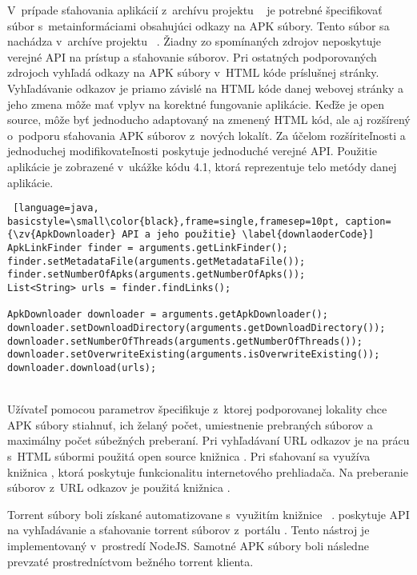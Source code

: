 \noindent V~prípade sťahovania aplikácií z~archívu projektu ~\cite{Viennot2014} je potrebné špecifikovať súbor s~metainformáciami obsahujúci odkazy na APK súbory. Tento súbor sa nachádza v~archíve projektu ~\cite{archiveOrg}. Žiadny zo spomínaných zdrojov neposkytuje verejné API na prístup a sťahovanie súborov. Pri ostatných podporovaných zdrojoch  vyhľadá odkazy na APK súbory v~HTML kóde príslušnej stránky. Vyhľadávanie odkazov je priamo závislé na HTML kóde danej webovej stránky a jeho zmena môže mať vplyv na korektné fungovanie aplikácie. Keďže je  open source, môže byť jednoducho adaptovaný na zmenený HTML kód, ale aj rozšírený o~podporu sťahovania APK súborov z~nových lokalít. Za účelom rozšíriteľnosti a jednoduchej modifikovateľnosti poskytuje  jednoduché verejné API. Použitie aplikácie  je zobrazené v~ukážke kódu 4.1, ktorá reprezentuje telo metódy  danej aplikácie. \\
\begin{lstlisting} [language=java, basicstyle=\small\color{black},frame=single,framesep=10pt, caption= {\zv{ApkDownloader} API a jeho použitie} \label{downlaoderCode}]
ApkLinkFinder finder = arguments.getLinkFinder();
finder.setMetadataFile(arguments.getMetadataFile());
finder.setNumberOfApks(arguments.getNumberOfApks());
List<String> urls = finder.findLinks();

ApkDownloader downloader = arguments.getApkDownloader();
downloader.setDownloadDirectory(arguments.getDownloadDirectory());
downloader.setNumberOfThreads(arguments.getNumberOfThreads());
downloader.setOverwriteExisting(arguments.isOverwriteExisting());
downloader.download(urls);
\end{lstlisting}
\mbox{}\\
\noindent Užívateľ pomocou parametrov špecifikuje z~ktorej podporovanej lokality chce APK súbory stiahnuť, ich želaný počet, umiestnenie prebraných súborov a maximálny počet súbežných preberaní. Pri vyhľadávaní URL odkazov je na prácu s~HTML súbormi použitá open source knižnica . Pri sťahovaní sa využíva knižnica , ktorá poskytuje funkcionalitu internetového prehliadača. Na preberanie súborov z~URL odkazov je použitá knižnica . 

Torrent súbory boli získané automatizovane s~využitím knižnice ~\cite{flux}.  poskytuje API na vyhľadávanie a sťahovanie torrent súborov z~portálu . Tento nástroj je implementovaný v~prostredí NodeJS. Samotné APK súbory boli následne prevzaté prostredníctvom bežného torrent klienta.